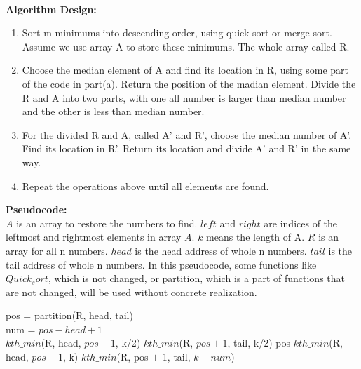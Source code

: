 \begin{parts}
\begin{subparts}
    \begin{solution} \\
      \textbf{Algorithm Design:}
      \begin{enumerate}
        \item Sort m minimums into descending order, using quick sort or merge sort.
              Assume we use array A to store these minimums. The whole array called R.
        \item Choose the median element of A and find its location in R, using some part of the code in part(a). Return the position of the madian element.
              Divide the R and A into two parts, with one all number is larger than median number and the other is less than median number.
        \item For the divided R and A, called A' and R', choose the median number of A'. Find its location in R'. Return its location and divide A' and R' in the same way.
        \item Repeat the operations above until all elements are found.
      \end{enumerate}
      \textbf{Pseudocode:}\\
      $A$ is an array to restore the numbers to find. $left$ and $right$ are indices of the leftmost and rightmost elements in array $A$.
      $k$ means the length of A. $R$ is an array for all n numbers.
      $head$ is the head address of whole n numbers. $tail$ is the tail address of whole n numbers.
      In this pseudocode, some functions like $Quick_sort$, which is not changed, or partition,
      which is a part of functions that are not changed, will be used without concrete realization.
      \begin{algorithm}[H]
        \color{blue}
        \begin{algorithmic}[1]
          \EndFunction

          \EndFunction

          \State pos = partition(R, head, tail) \\
          \State num = $pos - head + 1$ \\
          \State {}
          \State \State \Return $kth\_min$(R, head, $pos - 1$, k/2)
          \State \State \Return $kth\_min$(R, $pos + 1$, tail, k/2)
          \State \Else
          \State \Return pos
          \State \EndIf
          \State \Return $kth\_min$(R, head, $pos - 1$, k)
          \Else
          \State \Return $kth\_min$(R, pos $+$ 1, tail, $k - num$)
          \EndIf
          \EndFunction
        \end{algorithmic}
      \end{algorithm}
    \end{solution}


\end{subparts}
\end{parts}
